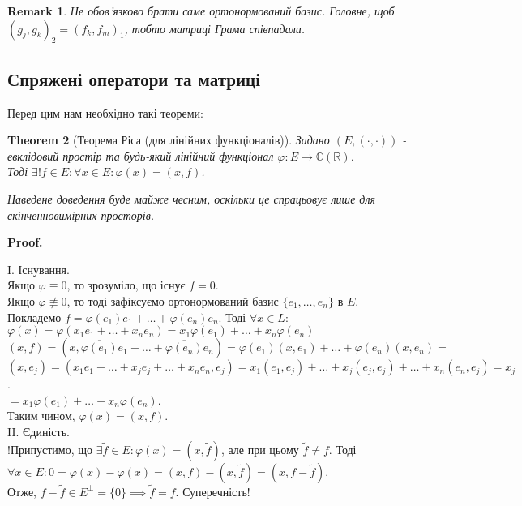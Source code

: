 \documentclass[a4paper, 10pt]{article}
\makeatletter
\theoremstyle{theoremdd}
\newtheorem{theorem}{Theorem}[subsection]
\newtheorem{remark}[theorem]{Remark}
\renewenvironment{proof}[1][Proof.\\]{\par
\pushQED{\hfill \qed}%
\normalfont \topsep6\p@\@plus6\p@\relax
\trivlist
\item\relax
{\bfseries
#1\@addpunct{.}}\hspace\labelsep\ignorespaces
}{%
\popQED\endtrivlist\@endpefalse
}
\makeatother
\begin{document}
\begin{remark}
Не обов'язково брати саме ортонормований базис. Головне, щоб $(g_j,g_k)_2 = (f_k,f_m)_1$, тобто матриці Грама співпадали.
\end{remark}

\subsection{Спряжені оператори та матриці}
Перед цим нам необхідно такі теореми:
\begin{theorem}[Теорема Ріса (для лінійних функціоналів)]
Задано $(E,(\cdot,\cdot))$ - евклідовий простір та будь-який лінійний функціонал $\varphi: E \to \mathbb{C} (\mathbb{R})$. \\ Тоді $\exists ! f \in E: \forall x \in E: \varphi(x) = (x,f)$.
\end{theorem}

\textit{Наведене доведення буде майже чесним, оскільки це спрацьовує лише для скінченновимірних просторів.}

\begin{proof}
I. Існування.\\
Якщо $\varphi \equiv 0$, то зрозуміло, що існує $f = 0$.\\
Якщо $\varphi \not\equiv 0$, то тоді зафіксуємо ортонормований базис $\{e_1,\dots,e_n\}$ в $E$. \\
Покладемо $f = \overline{\varphi(e_1)}e_1 + \dots + \overline{\varphi(e_n)}e_n$. Тоді $\forall x \in L:$\\
$\varphi(x) = \varphi(x_1 e_1+\dots+x_n e_n) = x_1 \varphi(e_1) + \dots + x_n \varphi(e_n)$\\
$(x,f) = (x,\overline{\varphi(e_1)}e_1 + \dots + \overline{\varphi(e_n)}e_n) = \varphi(e_1) (x,e_1) + \dots + \varphi(e_n)(x,e_n) \boxed{=}$\\
$(x,e_j) = (x_1 e_1 + \dots + x_j e_j + \dots + x_n e_n, e_j) = x_1 (e_1,e_j) + \dots + x_j (e_j,e_j) + \dots + x_n (e_n,e_j) = x_j$.\\
$\boxed{=} x_1 \varphi(e_1) + \dots + x_n \varphi(e_n)$.\\
Таким чином, $\varphi(x) = (x,f)$.
\bigskip \\
II. Єдиність.\\
!Припустимо, що $\exists \tilde{f} \in E: \varphi(x) = (x,\tilde{f})$, але при цьому $\tilde{f} \neq f$. Тоді\\
$\forall x \in E: 0 = \varphi(x) - \varphi(x) = (x,f) - (x,\tilde{f}) = (x,f-\tilde{f})$.\\
Отже, $f-\tilde{f} \in E^\perp = \{0\} \implies \tilde{f} = f$. Суперечність!
\end{proof}
\end{document}
